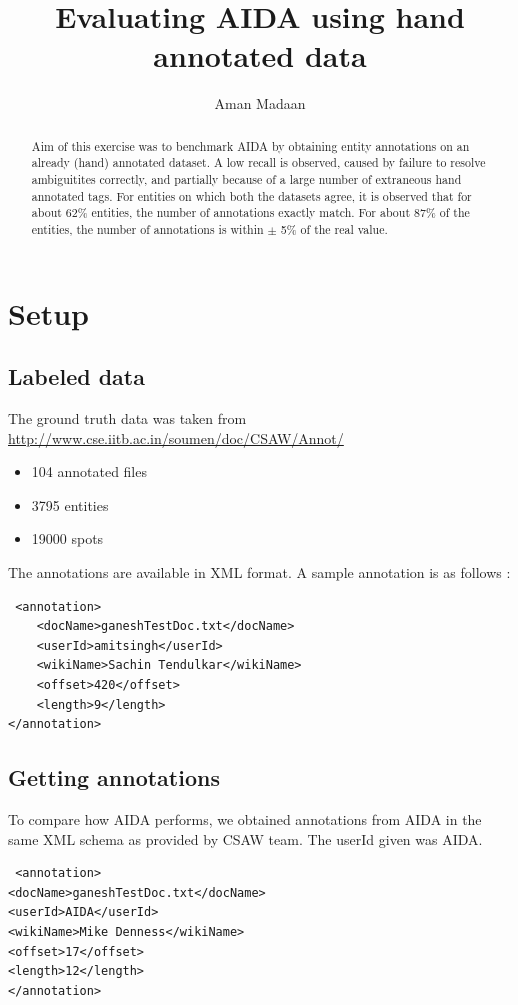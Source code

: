 \documentclass[a4paper,10pt]{article}
\title{Evaluating AIDA using hand annotated data}
\author{Aman Madaan}
\begin{document}
\maketitle

\begin{abstract}
Aim of this exercise was to benchmark AIDA by obtaining entity annotations on an already (hand) annotated dataset.
A low recall is observed, caused by failure to resolve ambiguitites correctly, and partially because of a large number
of extraneous hand annotated tags. For entities on which both the datasets agree, it is observed that for about 62\% entities, 
the number of annotations exactly match. For about 87\% of the entities, the number of annotations is within $\pm$ 5\% of the real value.


\end{abstract}

\section{Setup}
\subsection{Labeled data}
The ground truth data was taken from \url{http://www.cse.iitb.ac.in/soumen/doc/CSAW/Annot/}
\begin{itemize}
 \item 104 annotated files
 \item 3795 entities
 \item 19000 spots 
\end{itemize}

The annotations are available in XML format. A sample annotation is as follows : 
\begin{verbatim}
 <annotation>
	<docName>ganeshTestDoc.txt</docName>
	<userId>amitsingh</userId>
	<wikiName>Sachin Tendulkar</wikiName>
	<offset>420</offset>
	<length>9</length>
</annotation>
\end{verbatim}

\subsection{Getting annotations}
To compare how AIDA performs, we obtained annotations from AIDA in the same XML schema as
provided by CSAW team. The userId given was AIDA.
\begin{verbatim}
 <annotation>
<docName>ganeshTestDoc.txt</docName>
<userId>AIDA</userId>
<wikiName>Mike Denness</wikiName>
<offset>17</offset>
<length>12</length>
</annotation>
\end{verbatim}
\end{document}
